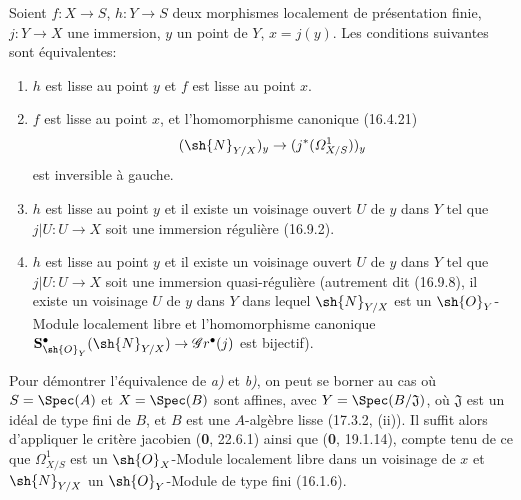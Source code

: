 \begin{theorem}[17.12.1]
\label{IV.17.12.1}
Soient $f:X\to S$, $h:Y\to S$ deux morphismes localement de présentation finie, $j:Y\to X$ une immersion, $y$ un point de $Y$, $x=j(y)$. Les conditions suivantes sont équivalentes:
\begin{enumerate}
  \item[\textup{a)}] $h$ est lisse au point $y$ et $f$ est lisse au point $x$.
  \item[\textup{b)}] $f$ est lisse au point $x$, et l'homomorphisme canonique \textup{(16.4.21)}
  \[
  (\sh{N}_{Y/X})_y\to(j^*(\varOmega^1_{X/S}))_y
  \]
  est inversible à gauche.
  \item[\textup{c)}] $h$ est lisse au point $y$ et il existe un voisinage ouvert $U$ de $y$ dans $Y$ tel que $j|U:U\to X$ soit une immersion régulière \textup{(16.9.2)}.


  \item[\textup{c$'$)}] $h$ est lisse au point $y$ et il existe un voisinage ouvert $U$ de $y$ dans $Y$ tel que $j|U:U\to X$ soit une immersion quasi-régulière \textup{(autrement dit (16.9.8), il existe un voisinage $U$ de $y$ dans $Y$ dans lequel $\sh{N}_{Y/X}$ est un $\sh{O}_Y$-Module localement libre et l'homomorphisme canonique $\mathbf{S}^{\bullet}_{\sh{O}_Y}(\sh{N}_{Y/X})\to\mathscr{G}r^{\bullet}(j)$ est bijectif)}.
\end{enumerate}
\end{theorem}

Pour démontrer l'équivalence de \emph{a)} et \emph{b)}, on peut se borner au cas où $S=\Spec(A)$ et $X=\Spec(B)$ sont affines, avec $Y=\Spec(B/\mathfrak J)$, où $\mathfrak J$ est un idéal de type fini de $B$, et $B$ est une $A$-algèbre lisse (17.3.2, (ii)). Il suffit alors d'appliquer le critère jacobien (\textbf{0}, 22.6.1) ainsi que (\textbf{0}, 19.1.14), compte tenu de ce que $\varOmega^1_{X/S}$ est un $\sh{O}_X$-Module localement libre dans un voisinage de $x$ et $\sh{N}_{Y/X}$ un $\sh{O}_Y$-Module de type fini (16.1.6).

